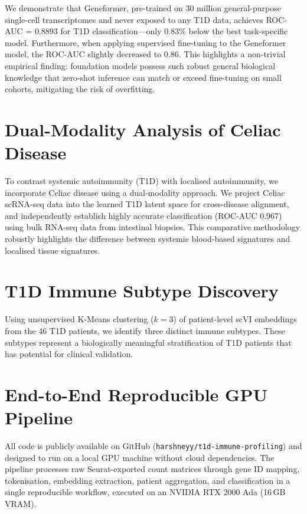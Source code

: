 We demonstrate that Geneformer, pre-trained on 30 million general-purpose single-cell transcriptomes and never exposed to any T1D data, achieves ROC-AUC = 0.8893 for T1D classification---only 0.83\% below the best task-specific model. Furthermore, when applying supervised fine-tuning to the Geneformer model, the ROC-AUC slightly decreased to 0.86. This highlights a non-trivial empirical finding: foundation models possess such robust general biological knowledge that zero-shot inference can match or exceed fine-tuning on small cohorts, mitigating the risk of overfitting.

\section{Dual-Modality Analysis of Celiac Disease}

To contrast systemic autoimmunity (T1D) with localised autoimmunity, we incorporate Celiac disease using a dual-modality approach. We project Celiac scRNA-seq data into the learned T1D latent space for cross-disease alignment, and independently establish highly accurate classification (ROC-AUC 0.967) using bulk RNA-seq data from intestinal biopsies. This comparative methodology robustly highlights the difference between systemic blood-based signatures and localised tissue signatures.

\section{T1D Immune Subtype Discovery}

Using unsupervised K-Means clustering ($k=3$) of patient-level scVI embeddings from the 46 T1D patients, we identify three distinct immune subtypes. These subtypes represent a biologically meaningful stratification of T1D patients that has potential for clinical validation.

\section{End-to-End Reproducible GPU Pipeline}

All code is publicly available on GitHub (\texttt{harshneyy/t1d-immune-profiling}) and designed to run on a local GPU machine without cloud dependencies. The pipeline processes raw Seurat-exported count matrices through gene ID mapping, tokenisation, embedding extraction, patient aggregation, and classification in a single reproducible workflow, executed on an NVIDIA RTX 2000 Ada (16\,GB VRAM).
